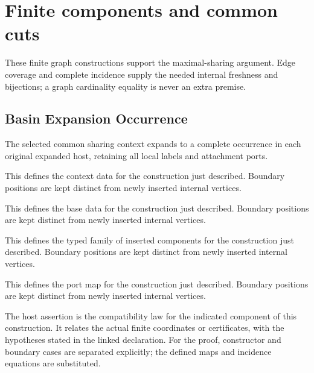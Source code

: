 \clearpage
\section{Finite components and common cuts}
\label{sec:component-concordance}
These finite graph constructions support the maximal-sharing argument. Edge coverage and complete incidence supply the needed internal freshness and bijections; a graph cardinality equality is never an extra premise.

\subsection{Basin Expansion Occurrence}
The selected common sharing context expands to a complete occurrence in each original expanded host, retaining all local labels and attachment ports.

This defines the context data for the construction just described. Boundary positions are kept distinct from newly inserted internal vertices.
\par{}

This defines the base data for the construction just described. Boundary positions are kept distinct from newly inserted internal vertices.
\par{}

This defines the typed family of inserted components for the construction just described. Boundary positions are kept distinct from newly inserted internal vertices.
\par{}

This defines the port map for the construction just described. Boundary positions are kept distinct from newly inserted internal vertices.
\par{}

The host assertion is the compatibility law for the indicated component of this construction. It relates the actual finite coordinates or certificates, with the hypotheses stated in the linked declaration.
For the proof, constructor and boundary cases are separated explicitly; the defined maps and incidence equations are substituted.
\par{}

